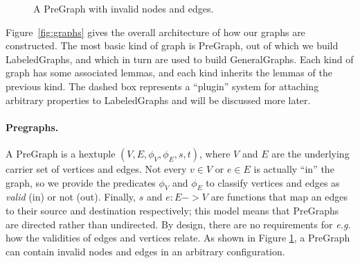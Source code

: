 \begin{figure}[t]
\centering
{}
\endpgfgraphicnamed
\vspace{1ex}
\caption{A PreGraph with invalid nodes and edges.}\label{fig:pregraph}
\end{figure}

Figure~\ref{fig:graphs} gives the overall architecture of how our graphs are constructed.
The most basic kind of graph is PreGraph, out of which we build LabeledGraphs, and which in turn are used
to build GeneralGraphs.  {\color{magenta} Each kind of graph has some associated lemmas, and each kind inherits the lemmas of the previous kind.}  The dashed box represents a ``plugin'' system for attaching arbitrary properties to LabeledGraphs and will be discussed more later. %

\paragraph{Pregraphs.} A PreGraph is a hextuple $(V, E, \phi_V, \phi_E, s, t)$,
where $V$ and $E$ are the underlying carrier set of vertices and edges.  Not every $v \in V$ or $e \in E$ is actually ``in'' the graph, so we provide the predicates $\phi_V$ and $\phi_E$ to classify vertices and edges as \emph{valid} (in) or not (out).  Finally, $s$ and $e : E -> V$ are functions that map an edges to their source and destination respectively; this model means that PreGraphs are directed rather than undirected.  By design, there are no requirements for \emph{e.g.} how the validities of edges and vertices relate.  As shown in Figure \ref{fig:pregraph}, a PreGraph can contain invalid nodes and edges in an arbitrary configuration.

